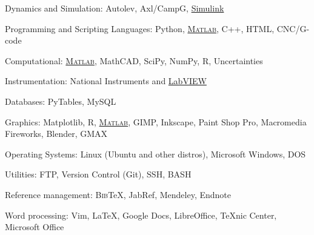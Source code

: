 \documentclass[10pt]{article}
\newcommand{\blankline}{\quad\pagebreak[2]}
\begin{document}
\blankline

Dynamics and Simulation: Autolev, Axl/CampG,
\href{http://www.mathworks.com/products/simulink/}{Simulink}

\blankline

Programming and Scripting Languages: Python,
\href{http://www.mathworks.com/products/matlab/}{\textsc{Matlab}}, C++, HTML,
CNC/G-code

\blankline

Computational:
\href{http://www.mathworks.com/products/matlab/}{\textsc{Matlab}}, MathCAD,
SciPy, NumPy, R, Uncertainties

\blankline

Instrumentation: National Instruments and \href{http://www.ni.com/}{LabVIEW}

\blankline

Databases: PyTables, MySQL

\blankline

Graphics: Matplotlib, R,
\href{http://www.mathworks.com/products/matlab/}{\textsc{Matlab}}, GIMP,
Inkscape, Paint Shop Pro, Macromedia Fireworks, Blender, GMAX

\blankline

Operating Systems: Linux (Ubuntu and other distros), Microsoft Windows, DOS

\blankline

Utilities: FTP, Version Control (Git), SSH, BASH

\blankline

Reference management: B\textsc{ib}\TeX{}, JabRef, Mendeley, Endnote

\blankline

Word processing: Vim, \LaTeX{}, Google Docs, LibreOffice, TeXnic Center,
Microsoft Office

\end{document}
